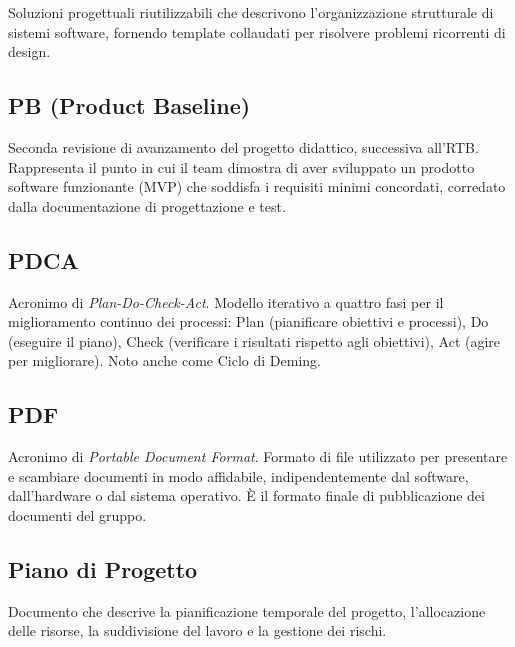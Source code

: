 \documentclass[a4paper, 11pt, oneside]{scrartcl} %
\begin{document}

Soluzioni progettuali riutilizzabili che descrivono l'organizzazione strutturale di sistemi software, fornendo template collaudati per risolvere problemi ricorrenti di design.

\vspace{0.5cm}

\subsection*{PB (Product Baseline)}
Seconda revisione di avanzamento del progetto didattico, successiva all'RTB. Rappresenta il punto in cui il team dimostra di aver sviluppato un prodotto software funzionante (MVP) che soddisfa i requisiti minimi concordati, corredato dalla documentazione di progettazione e test.
\vspace{0.5cm}

\subsection*{PDCA}
Acronimo di \textit{Plan-Do-Check-Act}. Modello iterativo a quattro fasi per il miglioramento continuo dei processi: Plan (pianificare obiettivi e processi), Do (eseguire il piano), Check (verificare i risultati rispetto agli obiettivi), Act (agire per migliorare). Noto anche come Ciclo di Deming.
\vspace{0.5cm}

\subsection*{PDF}
Acronimo di \textit{Portable Document Format}. Formato di file utilizzato per presentare e scambiare documenti in modo affidabile, indipendentemente dal software, dall'hardware o dal sistema operativo. È il formato finale di pubblicazione dei documenti del gruppo.
\vspace{0.5cm}

\subsection*{Piano di Progetto}


Documento che descrive la pianificazione temporale del progetto, l'allocazione delle risorse, la suddivisione del lavoro e la gestione dei rischi.
\end{document}

